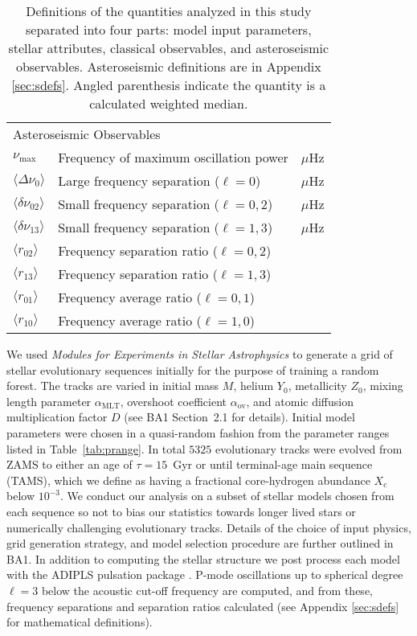 \begin{table}
{\begin{tabular}{lll}
%
\multicolumn{3}{l}{Asteroseismic Observables} \\
$\nu_{\max}$ & Frequency of maximum oscillation power & $\mu$Hz \\
$\langle\Delta\nu_0\rangle$ & Large frequency separation ($\ell=0$) & $\mu$Hz \\
$\langle\delta\nu_{02}\rangle$ & Small frequency separation ($\ell=0,2$) & $\mu$Hz \\
$\langle\delta\nu_{13}\rangle$ & Small frequency separation ($\ell=1,3$) & $\mu$Hz \\
$\langle r_{02}\rangle$ & Frequency separation ratio ($\ell=0,2$) &  \\
$\langle r_{13}\rangle$ & Frequency separation ratio ($\ell=1,3$) &  \\
$\langle r_{01}\rangle$ & Frequency average ratio ($\ell=0,1$) & \\
$\langle r_{10}\rangle$ & Frequency average ratio ($\ell=1,0$) & \\[8pt]\hline 
\end{tabular}
}
\caption{Definitions of the quantities analyzed in this study separated into four parts: model input parameters, stellar attributes, classical observables, and asteroseismic observables. 
Asteroseismic definitions are in Appendix \ref{sec:sdefs}. 
Angled parenthesis indicate the quantity is a calculated weighted median.} 
\label{tab:parmdefs} 
\end{table} 



We used  \emph{Modules for Experiments in Stellar Astrophysics} \citep[MESA,][]{2011apjs..192....3p} to generate a grid of stellar evolutionary sequences initially for the purpose of training a random forest. The tracks are varied in initial mass $M$, helium $Y_0$, metallicity $Z_0$, mixing length parameter $\alpha_{\text{MLT}}$, overshoot coefficient $\alpha_{\text{ov}}$, and atomic diffusion multiplication factor $D$ (see BA1 Section~2.1 for details).
Initial model parameters were chosen in a quasi-random fashion from the parameter ranges listed in Table~\ref{tab:prange}.
In total $5325$ evolutionary tracks were evolved from ZAMS to either an age of ${\tau=15}$~Gyr or until terminal-age main sequence (TAMS), which we define as having a fractional core-hydrogen abundance $X_{\text{c}}$ below $10^{-3}$. We conduct our analysis on a subset of stellar models chosen from each sequence so not to bias our statistics towards longer lived stars or numerically challenging evolutionary tracks. 
Details of the choice of input physics, grid generation strategy, and model selection procedure are further outlined in BA1. 
In addition to computing the stellar structure we post process  each model with  the ADIPLS pulsation package \citep{2008Ap&SS.316..113C}.  P-mode oscillations up to spherical degree ${\ell=3}$ below the acoustic cut-off frequency are computed, and from these, frequency separations and separation ratios calculated (see Appendix \ref{sec:sdefs} for mathematical definitions). 


